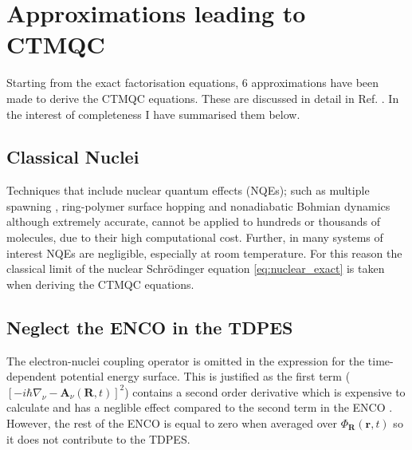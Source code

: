 \section{Approximations leading to CTMQC}
\label{sect:CTMQC_Approx}
Starting from the exact factorisation equations, 6 approximations have been made to derive the CTMQC equations. These are discussed in detail in Ref. \cite{agostini_quantum-classical_2016}. In the interest of completeness I have summarised them below.
\subsection{Classical Nuclei}
Techniques that include nuclear quantum effects (NQEs); such as multiple spawning \cite{Martnnez*2005Oct}, ring-polymer surface hopping \cite{Shakib2017Jul} and nonadiabatic Bohmian dynamics \cite{Curchod2011Feb, Tavernelli2013Apr} although extremely accurate, cannot be applied to hundreds or thousands of molecules, due to their high computational cost. Further, in many systems of interest NQEs are negligible, especially at room temperature. For this reason the classical limit of the nuclear Schr\"odinger equation \eqref{eq:nuclear_exact} is taken when deriving the CTMQC equations.
\subsection{Neglect the ENCO in the TDPES}
The electron-nuclei coupling operator is omitted in the expression for the time-dependent potential energy surface. This is justified as the first term ($\left[-i \hbar \nabla_{\nu} - \mathbf{A}_{\nu}(\mathbf{R}, t) \right]^2$) contains a second order derivative which is expensive to calculate and has a neglible effect compared to the second term in the ENCO \cite{Scherrer2015Aug}. However, the rest of the ENCO is equal to zero when averaged over $\Phi_{\mathbf{R}}(\mathbf{r},t)$ so it does not contribute to the TDPES.

